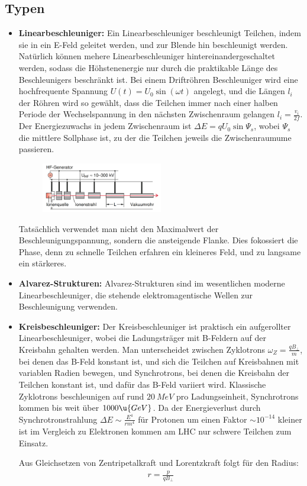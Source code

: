 \documentclass[final]{summery_5.0}
\begin{document}
\subsection{Typen}
\begin{itemize}
    \item {\bf Linearbeschleuniger:}
    Ein Linearbeschleuniger beschleunigt Teilchen, indem sie in ein E-Feld geleitet werden, und zur Blende hin beschleunigt werden. Natürlich können mehere Linearbeschleuniger hintereinandergeschaltet werden, sodass die Höhstenenergie nur durch die praktikable Länge des Beschleunigers beschränkt ist. 
    Bei einem Driftröhren Beschleuniger wird eine hochfrequente Spannung $U(t) = U_0 \sin(\omega t)$ angelegt, und die Längen $l_i$ der Röhren wird so gewählt, dass die Teilchen immer nach einer halben Periode der Wechselspannung in den nächsten Zwischenraum gelangen $l_i= \frac{v_i}{2f} $. Der Energiezuwachs in jedem Zwischenraum ist \(\Delta E= q U_0 \sin\Psi_s\), wobei $\Psi_s$ die mittlere Sollphase ist, zu der die Teilchen jeweils die Zwischenraumume passieren.
    \begin{figure}[H]
        \centering
        \includegraphics[width=0.5\textwidth]{linear_beschleuniger.png}
    \end{figure}
    Tatsächlich verwendet man nicht den Maximalwert der Beschleunigungspannung, sondern die ansteigende Flanke. Dies fokossiert die Phase, denn zu schnelle Teilchen erfahren ein kleineres Feld, und zu langsame ein stärkeres.

    \item{\bf Alvarez-Strukturen:}
    Alvarez-Strukturen sind im wesentlichen moderne Linearbeschleuniger, die stehende elektromagentische Wellen zur Beschleunigung verwenden. 

    \item{\bf Kreisbeschleuniger:}
    Der Kreisbeschleuniger ist praktisch ein aufgerollter Linearbeschleuniger, wobei die Ladungsträger mit B-Feldern auf der Kreisbahn gehalten werden. Man unterscheidet zwischen Zyklotrons $\omega_Z = \frac{qB_\perp}{m}$, bei denen das B-Feld konstant ist, und sich die Teilchen auf Kreisbahnen mit variablen Radien bewegen, und Synchrotrons, bei denen die Kreisbahn der Teilchen konstant ist, und dafür das B-Feld variiert wird. Klassische Zyklotrons beschleunigen auf rund $\SI{20}{MeV}$ pro Ladungseinheit, Synchrotrons kommen bis weit über $1000\u{GeV}$. Da der Energieverlust durch Synchrotronstrahlung $\Delta E \sim \frac{E^4}{rm^4}$ für Protonen um einen Faktor $\sim10^{-14}$ kleiner ist im Vergleich zu Elektronen kommen am LHC nur schwere Teilchen zum Einsatz. 

    Aus Gleichsetzen von Zentripetalkraft und Lorentzkraft folgt für den Radius:
    \begin{align*}
        r = \frac p {qB_\perp}
    \end{align*}
\end{itemize}
\end{document}
